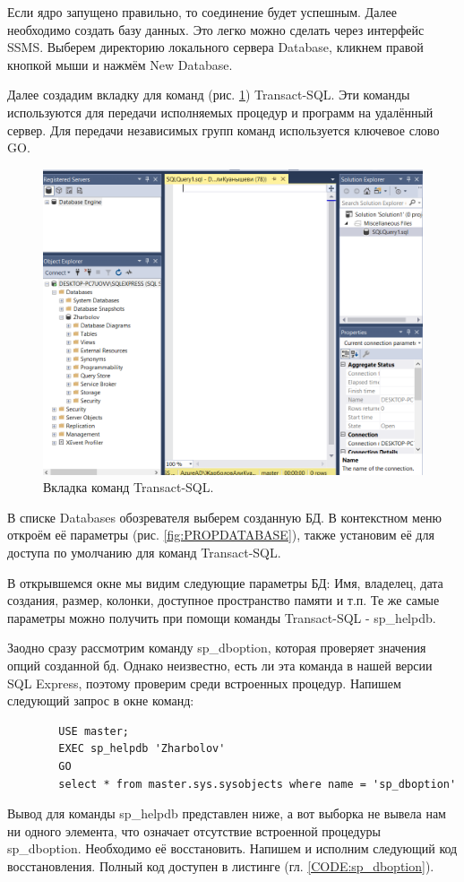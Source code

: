 Если ядро запущено правильно, то соединение будет успешным. Далее необходимо создать базу данных. Это легко можно сделать через интерфейс SSMS. Выберем директорию локального сервера Database, кликнем правой кнопкой мыши и нажмём New Database. 

Далее создадим вкладку для команд (рис. \ref{fig:NewQuery}) Transact-SQL. Эти команды используются для передачи исполняемых процедур и программ на удалённый сервер. Для передачи независимых групп команд используется ключевое слово GO. 

\begin{figure}[h!]
    \centering
    \includegraphics[width=0.3\linewidth]{Pic/lab1/NewQuery.PNG}
    \caption{Вкладка команд Transact-SQL.}
    \label{fig:NewQuery}
\end{figure}

В списке Databases обозревателя выберем созданную БД. В контекстном меню откроём её параметры (рис. \ref{fig:PROPDATABASE}), также установим её для доступа по умолчанию для команд Transact-SQL.

В открывшемся окне мы видим следующие параметры БД: Имя, владелец, дата создания, размер, колонки, доступное пространство памяти и т.п. Те же самые параметры можно получить при помощи команды Transact-SQL - sp\_helpdb. 

Заодно сразу рассмотрим команду sp\_dboption, которая проверяет значения опций созданной бд. Однако неизвестно, есть ли эта команда в нашей версии SQL Express, поэтому проверим среди встроенных процедур. Напишем следующий запрос в окне команд:

\begin{verbatim}
        USE master;
        EXEC sp_helpdb 'Zharbolov'
        GO
        select * from master.sys.sysobjects where name = 'sp_dboption'
\end{verbatim}

Вывод для команды sp\_helpdb представлен ниже, а вот выборка не вывела нам ни одного элемента, что означает отсутствие встроенной процедуры sp\_dboption. Необходимо её восстановить. Напишем и исполним следующий код восстановления. Полный код доступен в листинге (гл. \ref{CODE:sp_dboption}).

